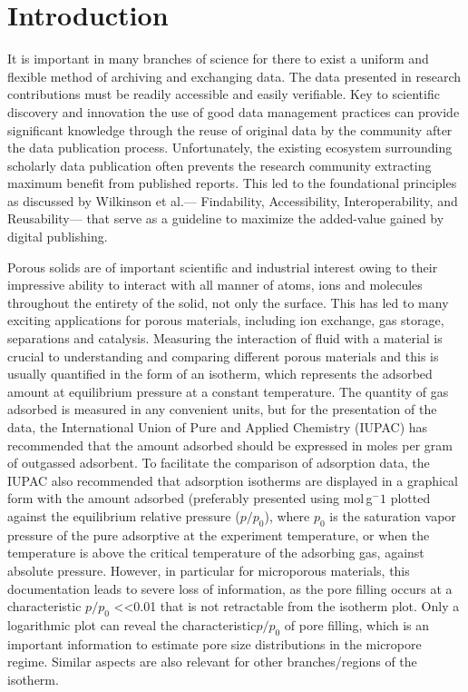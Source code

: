 \documentclass[journal=langd5,manuscript=article]{achemso}
\begin{document}
\section{Introduction}
It is important in many branches of science for there to exist a uniform and flexible method of archiving and exchanging data.
The data presented in research contributions must be readily accessible and easily verifiable.\cite{10.1021/acs.langmuir.9b02963}
Key to scientific discovery and innovation the use of good data management practices can  provide significant knowledge through the reuse of original data by the community after the data publication process.\cite{10.1002/adts.201900131}
Unfortunately, the existing ecosystem surrounding scholarly data publication often prevents the research community extracting maximum benefit from published reports.
This led to the foundational principles as discussed by Wilkinson et al.--- Findability, Accessibility, Interoperability, and Reusability--- that serve as a guideline to maximize the added-value gained by digital publishing.\cite{10.1038/sdata.2016.18}

Porous solids are of important scientific and industrial interest owing to their impressive ability to interact with all manner of atoms, ions and molecules throughout the entirety of the solid, not only the surface.\cite{10.1038/nature00785}
This has led to many exciting applications for porous materials, including ion exchange, gas storage, separations and catalysis.\cite{10.1039/C6CS00135A}
Measuring the interaction of fluid with a material is crucial to understanding and comparing different porous materials and this is usually quantified in the form of an isotherm, which represents the adsorbed amount at equilibrium pressure at a constant temperature.
The quantity of gas adsorbed is measured in any convenient units, but for the presentation of the data, the International Union of Pure and Applied Chemistry (IUPAC) has recommended that the amount adsorbed should be expressed in moles per gram of outgassed adsorbent.\cite{10.1515/pac-2014-1117}
To facilitate the comparison of adsorption data, the IUPAC also recommended that adsorption isotherms are displayed in a graphical form with the amount adsorbed (preferably presented using mol$\,$g$^-1$ plotted against the equilibrium relative pressure ($p/p_0$), where $p_0$ is the saturation vapor pressure of the pure adsorptive at the experiment temperature, or when the temperature is above the critical temperature of the adsorbing gas, against absolute pressure.
However, in particular for microporous materials, this documentation leads to severe loss of information, as the pore filling occurs at a characteristic $p/p_0$ \textless\textless 0.01 that is not retractable from the isotherm plot.
Only a logarithmic plot can reveal the characteristic$ p/p_0$ of pore filling, which is an important information to estimate pore size distributions in the micropore regime.
Similar aspects are also relevant for other branches/regions of the isotherm. 
\end{document}
